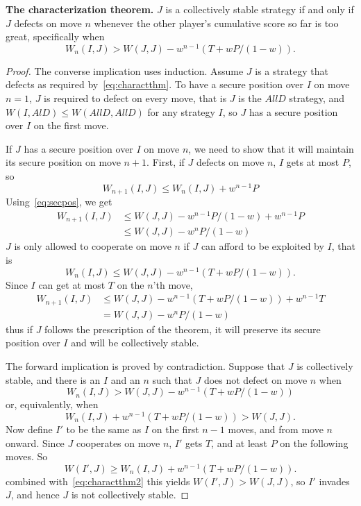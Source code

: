 \begin{theorem}\textbf{The characterization theorem.} \label{thm:charactthm}
$J$ is a collectively stable strategy if and only if $J$ defects on move $n$ whenever the other player's cumulative score so far is too great, specifically when
\begin{equation}\label{eq:charactthm}
W_n(I,J) > W(J, J) - w^{n-1}(T + wP/(1-w)).
\end{equation}
\end{theorem}
\begin{proof}
The converse implication uses induction. Assume $J$ is a strategy that defects as required by~\ref{eq:charactthm}. To have a secure position over $I$ on move $n=1$, $J$ is required to defect on every move, that is $J$ is the $AllD$ strategy, and $W(I, AlD) \leq W(AllD, AllD)$ for any strategy $I$, so $J$ has a secure position over $I$ on the first move.

If $J$ has a secure position over $I$ on move $n$, we need to show that it will maintain its secure position on move $n+1$. First, if $J$ defects on move $n$, $I$ gets at most $P$, so
\[
W_{n+1}(I, J) \leq W_n(I, J) + w^{n-1}P
\]
Using~\ref{eq:secpos}, we get
\begin{align*}
W_{n+1}(I, J) 
&\leq W(J, J) - w^{n-1}P/(1-w) + w^{n-1}P \\
&\leq W(J, J) - w^{n}P/(1-w)
\end{align*}
$J$ is only allowed to cooperate on move $n$ if $J$ can afford to be exploited by $I$, that is
\[
W_n (I, J) \leq W(J, J) - w^{n-1}(T + wP/(1-w)).
\]
Since $I$ can get at most $T$ on the $n$'th move,
\begin{align*}
W_{n+1} (I, J)
&\leq W(J, J) - w^{n-1} (T + wP/(1-w)) + w^{n-1}T \\
&= W(J, J) - w^n P / (1-w)
\end{align*}
thus if $J$ follows the prescription of the theorem, it will preserve its secure position over $I$ and will be collectively stable.

The forward implication is proved by contradiction. Suppose that $J$ is collectively stable, and there is an $I$ and an $n$ such that $J$ does not defect on move $n$ when
\[
W_n (I, J) > W(J, J) - w^{n-1}(T + wP / (1-w))
\]
or, equivalently, when
\begin{equation}\label{eq:charactthm2}
W_n (I, J) + w^{n-1}(T + wP / (1-w)) > W(J, J).
\end{equation}
Now define $I'$ to be the same as $I$ on the first $n-1$ moves, and from move $n$ onward. Since $J$ cooperates on move $n$, $I'$ gets $T$, and at least $P$ on the following moves. So
\[
W(I', J) \geq W_n (I, J) + w^{n-1}(T + wP/(1-w)).
\]
combined with~\ref{eq:charactthm2} this yields $W(I', J) > W(J, J)$, so $I'$ invades $J$, and hence $J$ is not collectively stable.
\end{proof}



